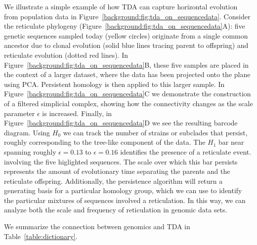 We illustrate a simple example of how TDA can capture horizontal evolution from population data in Figure~\ref{background:fig:tda_on_sequencedata}.
Consider the reticulate phylogeny (Figure~\ref{background:fig:tda_on_sequencedata}A): five genetic sequences sampled today (yellow circles) originate from a single common ancestor due to clonal evolution (solid blue lines tracing parent to offspring) and reticulate evolution (dotted red lines).
In Figure~\ref{background:fig:tda_on_sequencedata}B, these five samples are placed in the context of a larger dataset, where the data has been projected onto the plane using PCA.
Persistent homology is then applied to this larger sample.
In Figure~\ref{background:fig:tda_on_sequencedata}C we demonstrate the construction of a filtered simplicial complex, showing how the connectivity changes as the scale parameter $\epsilon$ is increased.
Finally, in Figure~\ref{background:fig:tda_on_sequencedata}D we see the resulting barcode diagram.
Using $H_0$ we can track the number of strains or subclades that persist, roughly corresponding to the tree-like component of the data.
The $H_1$ bar near spanning roughly $\epsilon=0.13$ to $\epsilon=0.16$ identifies the presence of a reticulate event. involving the five higlighted sequences.
The scale over which this bar persists represents the amount of evolutionary time separating the parents and the reticulate offspring.
Additionally, the persistence algorithm will return a generating basis for a particular homology group, which we can use to identify the particular mixtures of sequences involved a reticulation.
In this way, we can analyze both the scale and frequency of reticulation in genomic data sets.

We summarize the connection between genomics and TDA in Table~\ref{table:dictionary}.

